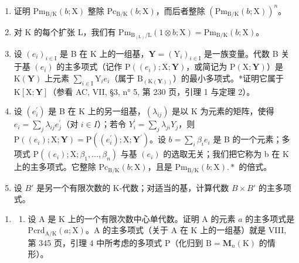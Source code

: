 \begin{enumerate}
\def\labelenumi{\alph{enumi})}
\item
  证明 \(\mathrm{Pm}_{\mathrm{B / K}}(b;\mathrm{X})\) 整除 \(\mathrm{Pc}_{\mathrm{B / K}}(b;\mathrm{X})\)，而后者整除 \((\mathrm{Pm}_{\mathrm{B / K}}(b;\mathrm{X}))^n\)。
\item
  对 K 的每个扩张 L，我们有 \(\mathrm{Pm}_{\mathrm{B}_{(\mathrm{L})}/\mathrm{L}}(1 \otimes b; \mathrm{X}) = \mathrm{Pm}_{\mathrm{B}/\mathrm{K}}(b; \mathrm{X})\)。
\item
  设 \((e_i)_{i\in \mathrm{I}}\) 是 B 在 K 上的一组基，\(\mathbf{Y} = (\mathrm{Y}_i)_{i\in \mathrm{I}}\) 是一族变量。代数 B 关于基 \((e_i)\) 的主多项式（记作 \(\mathrm{P}((e_i);\mathrm{X};\mathbf{Y})\)，或简记为 \(\mathrm{P}(\mathrm{X};\mathbf{Y})\)）是 \(\mathrm{K}(\mathbf{Y})\) 上元素 \(\sum_{i\in \mathrm{I}}\mathrm{Y}_i e_i\)（属于 \(\mathrm{B}_{(\mathrm{K}(\mathbf{Y}))}\)）的最小多项式。*证明它属于 \(\mathrm{K}[\mathrm{X};\mathbf{Y}]\)（参看 AC, VII, §3, n° 5, 第 230 页，引理 1 与定理 2）。
\item
  设 \((e_{i}^{\prime})\) 是 B 在 K 上的另一组基，\((\lambda_{ij})\) 是以 K 为元素的矩阵，使得 \(e_{i} = \sum_{j} \lambda_{ij} e_{j}^{\prime}\)（对 \(i \in I\)）；若令 \(Y_{i}^{\prime} = \sum_{j} \lambda_{ji} Y_{j}\)，则 \(\mathrm{P}((e_{i}); \mathrm{X}; \mathbf{Y}) = \mathrm{P}((e_{i}^{\prime}); \mathrm{X}; \mathbf{Y}^{\prime})\)。设 \(b = \sum_{i} \beta_{i} e_{i}\) 是 B 的一个元素；多项式 \(\mathrm{P}((e_{i}); \mathrm{X}; \beta_{1}, \ldots, \beta_{n})\) 与基 \((e_{i})\) 的选取无关；我们把它称为 b 在 K 上的主多项式。它整除 \(\mathrm{Pc}_{\mathrm{B/K}}(b; \mathrm{X})\)，且是 \(\mathrm{Pm}_{\mathrm{B/K}}(b; \mathrm{X}).*\) 的倍式。
\item
  设 \(B'\) 是另一个有限次数的 K-代数；对适当的基，计算代数 \(B \times B'\) 的主多项式。
\end{enumerate}

\begin{enumerate}
\def\labelenumi{\arabic{enumi})}
\setcounter{enumi}{2}
\tightlist
\item
  \begin{enumerate}
  \def\labelenumii{\alph{enumii})}
  \tightlist
  \item
    设 A 是 K 上的一个有限次数中心单代数。证明 A 的元素 \(a\) 的主多项式是 \(\mathrm{Pcrd}_{\mathrm{A} / \mathrm{K}}(a; \mathrm{X})\)。A 的主多项式（关于 A 在 K 上的一组基）就是 VIII, 第 345 页，引理 4 中所考虑的多项式 P（化归到 \(\mathrm{B} = \mathbf{M}_n(\mathrm{K})\) 的情形）。
  \end{enumerate}
\end{enumerate}

